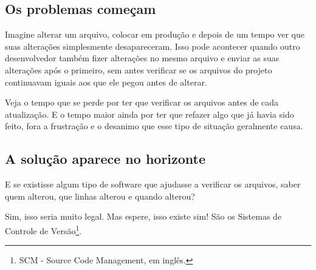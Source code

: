 \documentclass[12pt,a4paper]{report}
\begin{document}
    \subsection{Os problemas começam}
        Imagine alterar um arquivo, colocar em produção e depois de um tempo ver
        que suas alterações simplesmente desapareceram. Isso pode acontecer quando
        outro desenvolvedor também fizer alterações no mesmo arquivo e enviar as
        suas alterações após o primeiro, sem antes verificar se os arquivos do
        projeto continuavam iguais aos que ele pegou antes de alterar.
        
        Veja o tempo que se perde por ter que verificar os arquivos antes de
        cada atualização. E o tempo maior ainda por ter que refazer algo que já
        havia sido feito, fora a frustração e o desanimo que esse tipo de
        situação geralmente causa.
    
    \subsection{A solução aparece no horizonte}
        E se existisse algum tipo de software que ajudasse a verificar os
        arquivos, saber quem alterou, que linhas alterou e quando alterou?
        
        Sim, isso seria muito legal. Mas espere, isso existe sim! São os
        Sistemas de Controle de Versão\footnote{SCM - Source Code Management,
        em inglês.}.
\end{document}
